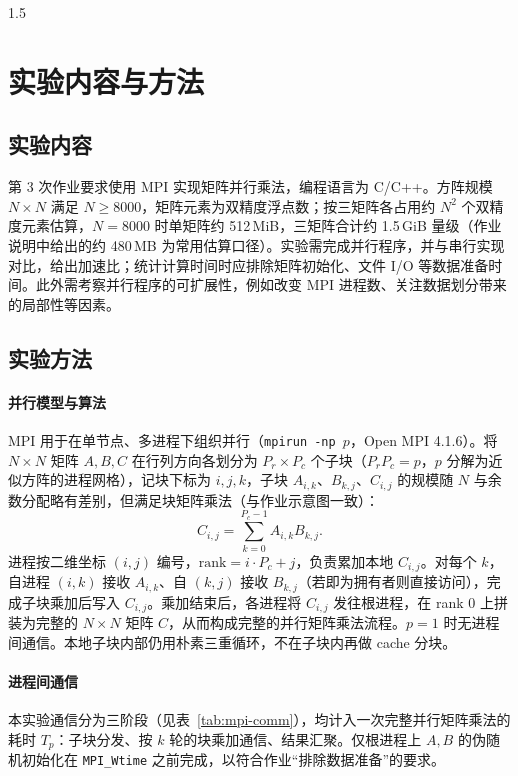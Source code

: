 \documentclass[zihao=-4]{ctexart}
\begin{document}
\begin{spacing}{1.5}
\section{实验内容与方法}

\subsection{实验内容}
第 3 次作业要求使用 MPI 实现矩阵并行乘法，编程语言为 C/C++。方阵规模 \(N\times N\) 满足 \(N\ge 8000\)，矩阵元素为双精度浮点数；按三矩阵各占用约 \(N^2\) 个双精度元素估算，\(N=8000\) 时单矩阵约 512\,MiB，三矩阵合计约 1.5\,GiB 量级（作业说明中给出的约 480\,MB 为常用估算口径）。实验需完成并行程序，并与串行实现对比，给出加速比；统计计算时间时应排除矩阵初始化、文件 I/O 等数据准备时间。此外需考察并行程序的可扩展性，例如改变 MPI 进程数、关注数据划分带来的局部性等因素。

\subsection{实验方法}

\paragraph{并行模型与算法}
MPI 用于在单节点、多进程下组织并行（\texttt{mpirun -np $p$}，Open MPI 4.1.6）。将 \(N\times N\) 矩阵 \(A,B,C\) 在行列方向各划分为 \(P_r\times P_c\) 个子块（\(P_r P_c=p\)，\(p\) 分解为近似方阵的进程网格），记块下标为 \(i,j,k\)，子块 \(A_{i,k}\)、\(B_{k,j}\)、\(C_{i,j}\) 的规模随 \(N\) 与余数分配略有差别，但满足块矩阵乘法（与作业示意图一致）：
\begin{equation*}
C_{i,j}=\sum_{k=0}^{P_c-1} A_{i,k} B_{k,j}.
\end{equation*}
进程按二维坐标 \((i,j)\) 编号，\(\mathrm{rank}=i\cdot P_c+j\)，负责累加本地 \(C_{i,j}\)。对每个 \(k\)，自进程 \((i,k)\) 接收 \(A_{i,k}\)、自 \((k,j)\) 接收 \(B_{k,j}\)（若即为拥有者则直接访问），完成子块乘加后写入 \(C_{i,j}\)。乘加结束后，各进程将 \(C_{i,j}\) 发往根进程，在 rank 0 上拼装为完整的 \(N\times N\) 矩阵 \(C\)，从而构成完整的并行矩阵乘法流程。\(p=1\) 时无进程间通信。本地子块内部仍用朴素三重循环，不在子块内再做 cache 分块。

\paragraph{进程间通信}
本实验通信分为三阶段（见表~\ref{tab:mpi-comm}），均计入一次完整并行矩阵乘法的耗时 \(T_p\)：子块分发、按 \(k\) 轮的块乘加通信、结果汇聚。仅根进程上 \(A,B\) 的伪随机初始化在 \texttt{MPI\_Wtime} 之前完成，以符合作业“排除数据准备”的要求。


\end{spacing}
\end{document}
